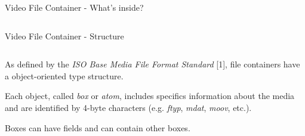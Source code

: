 \begin{tframe}{Video File Container - What's inside?}
\begin{minipage}{\textwidth}
\begin{columns}[T]
\end{columns}
\end{minipage}

\end{tframe}

\begin{tframe}{Video File Container - Structure}

\vspace{0.5cm}

\begin{minipage}{\textwidth}
\begin{columns}[T]

\begin{column}{0.55\textwidth}

As defined by the \emph{ISO Base Media File Format Standard} [1], file containers have a object-oriented type structure.

\vspace{0.5cm}

Each object, called \emph{box} or \emph{atom}, includes specifics information about the media and are identified by 4-byte characters (e.g. \emph{ftyp}, \emph{mdat}, \emph{moov}, etc.).

\vspace{0.5cm}

Boxes can have fields and can contain other boxes.

\end{column}


\end{columns}
\end{minipage}
\end{tframe}
